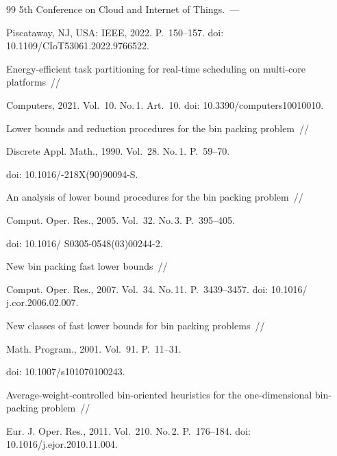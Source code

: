{{\begin{thebibliography}{99}
5th Conference on Cloud and Internet of Things.~--- 

Piscataway, NJ, USA: IEEE, 2022. P.~150--157. doi: 10.1109\!/\!CIoT53061.2022.9766522.



Energy-efficient task partitioning for real-time scheduling on multi-core platforms~/\!\!/

 Computers, 2021. Vol.~10. No.\,1. Art.~10.  doi: 10.3390\!/\!computers10010010.



Lower bounds and reduction procedures for the bin packing problem~/\!\!/ 

Discrete Appl. Math., 1990. Vol.~28. No.\,1. P.~59--70. 

doi: 10.1016\!/-218X(90)90094-S.



An analysis of lower bound procedures for the bin packing problem~/\!\!/ 

Comput. Oper. Res., 2005. Vol.~32. No.\,3. P.~395--405. 

doi: 10.1016\!/ S0305-0548(03)00244-2.



New bin packing fast lower bounds~/\!\!/ 

Comput. Oper. Res., 2007. Vol.~34. No.\,11. P.~3439--3457. doi: 10.1016\!/ j.cor.2006.02.007.



New classes of fast lower bounds for bin packing problems~/\!\!/

 Math. Program., 2001. Vol.~91. P.~11--31. 

doi: 10.1007\!/\!s101070100243.


 Average-weight-controlled bin-oriented heuristics for the one-dimensional bin-packing problem~/\!\!/ 

Eur. J. Oper. Res., 2011. Vol.~210. No.\,2. P.~176--184. doi: 10.1016\!/\!j.ejor.2010.11.004.


\end{thebibliography}}}
